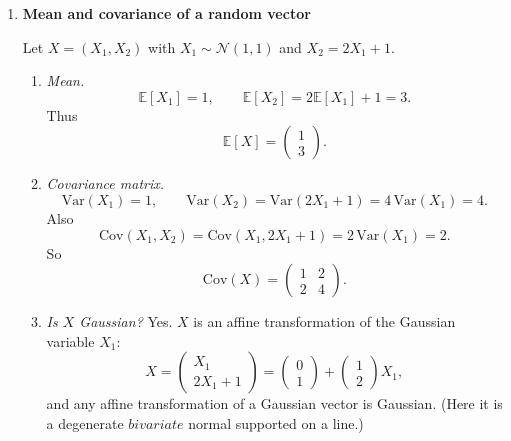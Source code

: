 \documentclass[11pt]{article}
\begin{document}
\begin{enumerate}
\begin{enumerate}
\item \emph{Independence?}
If independent, we would have $f_{X,Y}(x,y)=f_X(x)f_Y(y)= (2x)\cdot(2(1-y))=4x(1-y)$ on the support.
But the true joint density equals $2$ on $\{0\le y\le x\le1\}$, so they are not equal. Therefore $X$ and $Y$ are \textbf{not} independent.

\item \emph{Conditional expectation $\mathbb{E}[Y\mid X=x]$.}
For $x\in(0,1]$,
\[
f_{Y\mid X=x}(y)=\frac{f_{X,Y}(x,y)}{f_X(x)}
=\frac{2}{2x}\mathbf{1}_{\{0\le y\le x\}}
=\frac{1}{x}\mathbf{1}_{\{0\le y\le x\}},
\]
so $Y\mid X=x \sim U[0,x]$, hence
\[
\mathbb{E}[Y\mid X=x]=\frac{x}{2}.
\]
\end{enumerate}

\bigskip

\item \textbf{Mean and covariance of a random vector}

Let $X=(X_1,X_2)$ with $X_1\sim\mathcal{N}(1,1)$ and $X_2=2X_1+1$.

\begin{enumerate}
\item \emph{Mean.}
\[
\mathbb{E}[X_1]=1,\qquad \mathbb{E}[X_2]=2\mathbb{E}[X_1]+1=3.
\]
Thus
\[
\mathbb{E}[X]=\begin{pmatrix}1\\3\end{pmatrix}.
\]

\item \emph{Covariance matrix.}
\[
\mathrm{Var}(X_1)=1,\qquad \mathrm{Var}(X_2)=\mathrm{Var}(2X_1+1)=4\,\mathrm{Var}(X_1)=4.
\]
Also
\[
\mathrm{Cov}(X_1,X_2)=\mathrm{Cov}(X_1,2X_1+1)=2\,\mathrm{Var}(X_1)=2.
\]
So
\[
\mathrm{Cov}(X)=
\begin{pmatrix}
1 & 2\\
2 & 4
\end{pmatrix}.
\]

\item \emph{Is $X$ Gaussian?}
Yes. $X$ is an affine transformation of the Gaussian variable $X_1$:
\[
X=\begin{pmatrix} X_1 \\ 2X_1+1\end{pmatrix}
=
\begin{pmatrix} 0\\1\end{pmatrix}
+
\begin{pmatrix} 1\\2\end{pmatrix} X_1,
\]
and any affine transformation of a Gaussian vector is Gaussian. (Here it is a degenerate
$bivariate$ normal supported on a line.)
\end{enumerate}


\end{enumerate}
\end{document}
